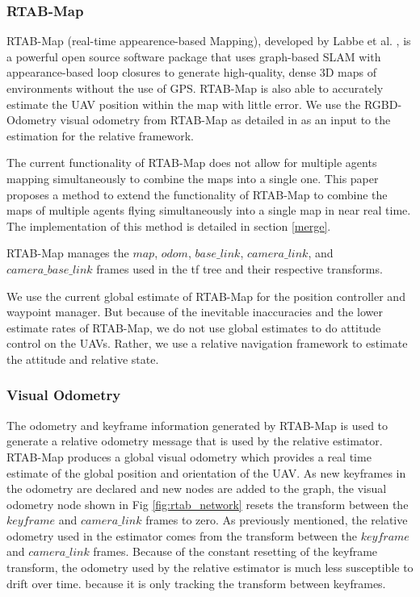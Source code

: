 \documentclass[letterpaper, 10 pt, conference]{ieeeconf}  %
\begin{document}
\subsubsection{RTAB-Map}

RTAB-Map (real-time appearence-based Mapping), developed by Labbe et al. \cite{Labbe2011}\cite{Labbe2013}\cite{Labbe2019}, is a powerful open source software package that uses graph-based SLAM with appearance-based loop closures to generate high-quality, dense 3D maps of environments without the use of GPS.  RTAB-Map is also able to accurately estimate the UAV position within the map with little error. We use the RGBD-Odometry visual odometry from RTAB-Map as detailed in \cite{Labbe2019} as an input to the estimation for the relative framework.

The current functionality of RTAB-Map does not allow for multiple agents mapping simultaneously to combine the maps into a single one. This paper proposes a method to extend the functionality of RTAB-Map to combine the maps of multiple agents flying simultaneously into a single map in near real time. The implementation of this method is detailed in section \ref{merge}.

RTAB-Map manages the $\mathit{map}$, $\mathit{odom}$, $\mathit{base\_link}$, $\mathit{camera\_link}$, and $\mathit{camera\_base\_link}$ frames used in the tf tree and their respective transforms.

We use the current global estimate of RTAB-Map for the position controller and waypoint manager. But because of the inevitable inaccuracies and the lower estimate rates of RTAB-Map, we do not use global estimates to do attitude control on the UAVs. Rather, we use a relative navigation framework to estimate the attitude and relative state.

\subsubsection{Visual Odometry}

The odometry and keyframe information generated by RTAB-Map is used to generate a relative odometry message that is used by the relative estimator. RTAB-Map produces a global visual odometry which provides a real time estimate of the global position and orientation of the UAV. As new keyframes in the odometry are declared and new nodes are added to the graph, the visual odometry node shown in Fig \ref{fig:rtab_network} resets the transform between the $\mathit{keyframe}$ and $\mathit{camera\_link}$ frames to zero. As previously mentioned, the relative odometry used in the estimator comes from the transform between the $\mathit{keyframe}$ and $\mathit{camera\_link}$ frames. Because of the constant resetting of the keyframe transform, the odometry used by the relative estimator is much less susceptible to drift over time. because it is only tracking the transform between keyframes.
\end{document}
